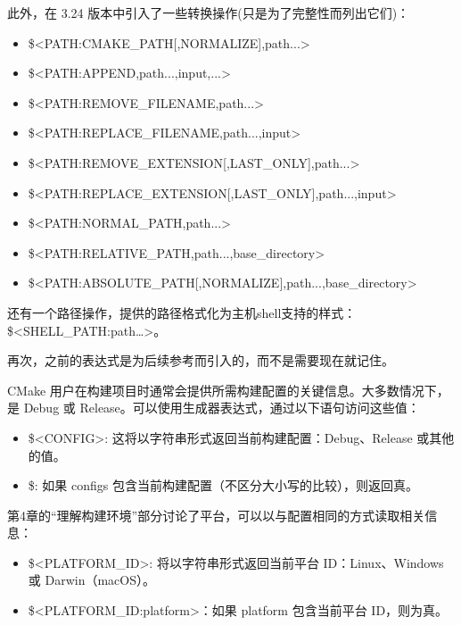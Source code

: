 此外，在 3.24 版本中引入了一些转换操作(只是为了完整性而列出它们)：

\begin{itemize}
\item
\$<PATH:CMAKE\_PATH[,NORMALIZE],path...>

\item
\$<PATH:APPEND,path...,input,...>

\item
\$<PATH:REMOVE\_FILENAME,path...>

\item
\$<PATH:REPLACE\_FILENAME,path...,input>

\item
\$<PATH:REMOVE\_EXTENSION[,LAST\_ONLY],path...>

\item
\$<PATH:REPLACE\_EXTENSION[,LAST\_ONLY],path...,input>

\item
\$<PATH:NORMAL\_PATH,path...>

\item
\$<PATH:RELATIVE\_PATH,path...,base\_directory>

\item
\$<PATH:ABSOLUTE\_PATH[,NORMALIZE],path...,base\_directory>
\end{itemize}

还有一个路径操作，提供的路径格式化为主机shell支持的样式：\$<SHELL\_PATH:path…>。

再次，之前的表达式是为后续参考而引入的，而不是需要现在就记住。


CMake 用户在构建项目时通常会提供所需构建配置的关键信息。大多数情况下，是 Debug 或 Release。可以使用生成器表达式，通过以下语句访问这些值：

\begin{itemize}
\item
\$<CONFIG>: 这将以字符串形式返回当前构建配置：Debug、Release 或其他的值。

\item
\$<CONFIG:configs>: 如果 configs 包含当前构建配置（不区分大小写的比较），则返回真。
\end{itemize}

第4章的“理解构建环境”部分讨论了平台，可以以与配置相同的方式读取相关信息：

\begin{itemize}
\item
\$<PLATFORM\_ID>: 将以字符串形式返回当前平台 ID：Linux、Windows 或 Darwin（macOS）。

\item
\$<PLATFORM\_ID:platform>：如果 platform 包含当前平台 ID，则为真。
\end{itemize}

